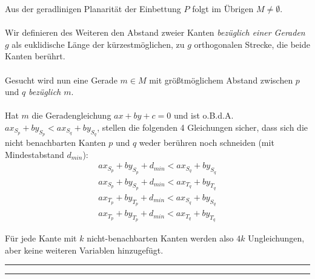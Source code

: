 \documentclass[a4paper,11pt]{amsart}
\begin{document}
\bigskip
\noindent Aus der geradlinigen Planarität der Einbettung $P$ folgt im Übrigen $M \ne \emptyset$.\\\\
Wir definieren des Weiteren den Abstand zweier Kanten \textit{bezüglich einer Geraden $g$} als euklidische Länge der kürzestmöglichen, zu $g$ orthogonalen Strecke, die beide Kanten berührt. \\\\
Gesucht wird nun eine Gerade $m \in M$ mit größtmöglichem Abstand zwischen $p$ und $q$ \textit{bezüglich $m$}.\\\\
Hat $m$ die Geradengleichung $ax + by + c = 0$ und ist o.B.d.A. $ax_S_p + by_S_p < ax_S_q + by_S_q$, stellen die folgenden 4 Gleichungen sicher, dass sich die nicht benachbarten Kanten $p$ und $q$ weder berühren noch schneiden (mit Mindestabstand $d_{min}$):
\bigskip
\begin{gather*}
ax_S_p + by_S_p + d_{min} < ax_S_q + by_S_q\\
ax_S_p + by_S_p + d_{min} < ax_T_q + by_T_q\\
ax_T_p + by_T_p + d_{min} < ax_S_q + by_S_q\\
ax_T_p + by_T_p + d_{min} < ax_T_q + by_T_q
\end{gather*}

\bigskip
\noindent Für jede Kante mit $k$ nicht-benachbarten Kanten werden also $4k$ Ungleichungen, aber keine weiteren Variablen hinzugefügt.
\bigskip
\hrule
\hrule


\bigskip
\bigskip
\bigskip
\end{document}
